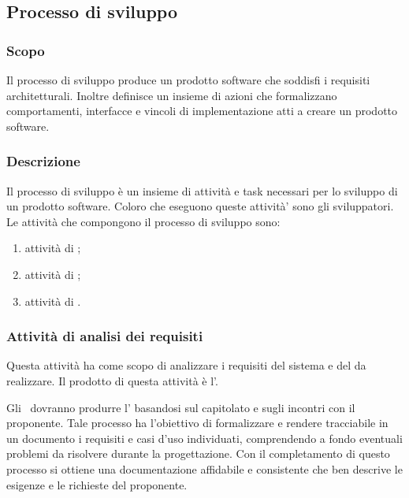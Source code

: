\documentclass[12pt,a4paper]{article}
\begin{document}
\subsection{Processo di sviluppo}

\subsubsection{Scopo}
Il processo di sviluppo produce un prodotto software che soddisfi i requisiti architetturali. Inoltre definisce un insieme di azioni che formalizzano comportamenti, interfacce e vincoli di implementazione atti a creare un prodotto software.

\subsubsection{Descrizione}
Il processo di sviluppo è un insieme di attività e task necessari per lo sviluppo di un prodotto software. Coloro che eseguono queste attività' sono gli sviluppatori. Le attività che compongono il processo di sviluppo sono:
\begin{enumerate}
	\item attività di \FA;
	\item attività di \FPA;
	\item attività di \FPDC.
\end{enumerate}

\subsubsection{Attività di analisi dei requisiti}
Questa attività ha come scopo di analizzare i requisiti del sistema e del  da realizzare. Il prodotto di questa attività è l'\AdR.

Gli \ANpl\ dovranno produrre l'\AdR{} basandosi sul capitolato e sugli incontri con il proponente. Tale processo ha l'obiettivo di formalizzare e rendere tracciabile in un documento i requisiti e casi d'uso individuati, comprendendo a fondo eventuali problemi da risolvere durante la progettazione. Con il completamento di questo processo si ottiene una documentazione affidabile e consistente che ben descrive le esigenze e le richieste del proponente.
\end{document}
